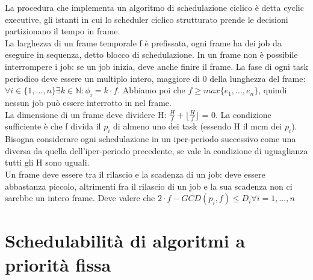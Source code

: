 \documentclass[12pt, oneside]{extbook}
\begin{document}
La procedura che implementa un algoritmo di schedulazione ciclico è detta cyclic executive, gli istanti in cui lo scheduler ciclico strutturato prende le decisioni partizionano il tempo in frame.\\ La larghezza di un frame temporale f è prefissata, ogni frame ha dei job da eseguire in sequenza, detto blocco di schedulazione. In un frame non è possibile interrompere i job: se un job inizia, deve anche finire il frame. La fase di ogni task periodico deve essere un multiplo intero, maggiore di 0 della lunghezza del frame: $\forall i \in \{1,...,n\} \exists k \in \mathbb{N}: \phi_i = k\cdot f$. Abbiamo poi che $f \geq max\{e_1,...,e_n\}$, quindi nessun job può essere interrotto in nel frame.\\ La dimensione di un frame deve dividere H: $\frac{H}{f} + \lfloor \frac{H}{f} \rfloor$ = 0. La condizione sufficiente è che f divida il $p_i$ di almeno uno dei task (essendo H il mcm dei $p_i$). Bisogna considerare ogni schedulazione in un iper-periodo successivo come una diversa da quella dell'iper-periodo precedente, se vale la condizione di uguaglianza tutti gli H sono uguali.\\ Un frame deve essere tra il rilascio e la scadenza di un job: deve essere abbastanza piccolo, altrimenti fra il rilascio di un job e la sua scadenza non ci sarebbe un intero frame. Deve valere che $2\cdot f - GCD(p_i, f) \leq D_i \forall i = 1,...,n$
\chapter{Schedulabilità di algoritmi a priorità fissa}
\end{document}

